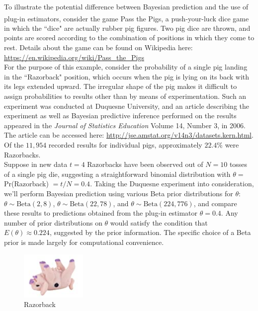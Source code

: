 \documentclass[12pt, a4paper]{article}
\begin{document}
\noindent To illustrate the potential difference between Bayesian prediction and the use of plug-in estimators, consider the game Pass the Pigs\textsuperscript{\circledR}, a push-your-luck dice game in which the ``dice" are actually rubber pig figures.  Two pig dice are thrown, and points are scored according to the combination of positions in which they come to rest.  Details about the game can be found on Wikipedia here: \url{https://en.wikipedia.org/wiki/Pass_the_Pigs}\\

\noindent For the purpose of this example, consider the probability of a single pig landing in the ``Razorback" position, which occurs when the pig is lying on its back with its legs extended upward.  The irregular shape of the pig makes it difficult to assign probabilities to results other than by means of experimentation.  Such an experiment was conducted at Duquesne University, and an article describing the experiment as well as Bayesian predictive inference performed on the results appeared in the \textit{Journal of Statistics Education} Volume 14, Number 3, in 2006.  The article can be accessed here:  \url{http://jse.amstat.org/v14n3/datasets.kern.html}. Of the $11,954$ recorded results for individual pigs, approximately $22.4\%$ were Razorbacks.\\

\noindent Suppose in new data $t=4$ Razorbacks have been observed out of $N=10$ tosses of a single pig die, suggesting a straightforward binomial distribution with $\theta =$ Pr(Razorback) $= t/N = 0.4$. Taking the Duquesne experiment into consideration, we'll perform Bayesian prediction using various Beta prior distributions for $\theta$: $\theta\sim\text{Beta}(2,8)$, $\theta\sim\text{Beta}(22,78)$, and $\theta\sim\text{Beta}(224,776)$, and compare these results to predictions obtained from the plug-in estimator $\theta = 0.4$.   Any number of prior distributions on $\theta$ would satisfy the condition that $E(\theta) \approx 0.224$, suggested by the prior information.  The specific choice of a Beta prior is made largely for computational convenience.\\

\begin{figure}
  \centering
    \includegraphics[width=0.28\textwidth]{./Graphics/PassThePigs/Razorback}
  \caption{Razorback}
\end{figure}
\end{document}

